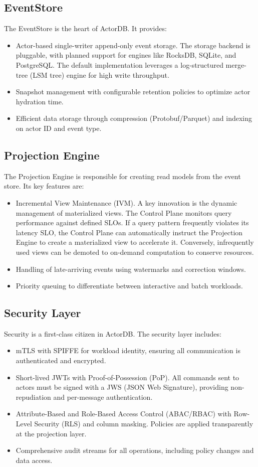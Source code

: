 \documentclass{article}
\begin{document}
\subsection{EventStore}
The EventStore is the heart of ActorDB. It provides:
\begin{itemize}
    \item Actor-based single-writer append-only event storage. The storage backend is pluggable, with planned support for engines like RocksDB, SQLite, and PostgreSQL. The default implementation leverages a log-structured merge-tree (LSM tree) engine for high write throughput.
    \item Snapshot management with configurable retention policies to optimize actor hydration time.
    \item Efficient data storage through compression (Protobuf/Parquet) and indexing on actor ID and event type.
\end{itemize}

\subsection{Projection Engine}
The Projection Engine is responsible for creating read models from the event store. Its key features are:
\begin{itemize}
    \item Incremental View Maintenance (IVM). A key innovation is the dynamic management of materialized views. The Control Plane monitors query performance against defined SLOs. If a query pattern frequently violates its latency SLO, the Control Plane can automatically instruct the Projection Engine to create a materialized view to accelerate it. Conversely, infrequently used views can be demoted to on-demand computation to conserve resources.
    \item Handling of late-arriving events using watermarks and correction windows.
    \item Priority queuing to differentiate between interactive and batch workloads.
\end{itemize}

\subsection{Security Layer}
Security is a first-class citizen in ActorDB. The security layer includes:
\begin{itemize}
    \item mTLS with SPIFFE for workload identity, ensuring all communication is authenticated and encrypted.
    \item Short-lived JWTs with Proof-of-Possession (PoP). All commands sent to actors must be signed with a JWS (JSON Web Signature), providing non-repudiation and per-message authentication.
    \item Attribute-Based and Role-Based Access Control (ABAC/RBAC) with Row-Level Security (RLS) and column masking. Policies are applied transparently at the projection layer.
    \item Comprehensive audit streams for all operations, including policy changes and data access.
\end{itemize}
\end{document}
